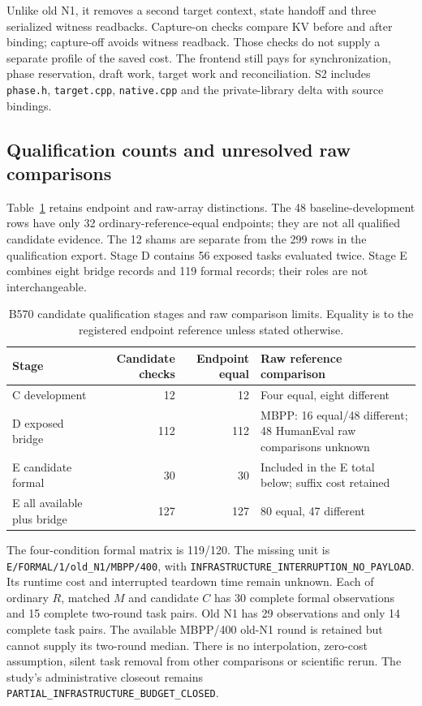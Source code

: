 Unlike old N1, it removes a second target context, state handoff and three serialized witness readbacks. Capture-on checks compare KV before and after binding; capture-off avoids witness readback. Those checks do not supply a separate profile of the saved cost. The frontend still pays for synchronization, phase reservation, draft work, target work and reconciliation. S2 includes \texttt{phase.h}, \texttt{target.cpp}, \texttt{native.cpp} and the private-library delta with source bindings.

\subsection{Qualification counts and unresolved raw comparisons}
Table~\ref{tab:b570_qualification} retains endpoint and raw-array distinctions. The 48 baseline-development rows have only 32 ordinary-reference-equal endpoints; they are not all qualified candidate evidence. The 12 shams are separate from the 299 rows in the qualification export. Stage D contains 56 exposed tasks evaluated twice. Stage E combines eight bridge records and 119 formal records; their roles are not interchangeable.

\begin{table}[ht]\centering\small
\caption{B570 candidate qualification stages and raw comparison limits. Equality is to the registered endpoint reference unless stated otherwise.}
\label{tab:b570_qualification}
\begin{tabularx}{\linewidth}{@{}lrrX@{}}\toprule
Stage & Candidate checks & Endpoint equal & Raw reference comparison\\\midrule
C development & 12 & 12 & Four equal, eight different\\
D exposed bridge & 112 & 112 & MBPP: 16 equal/48 different; 48 HumanEval raw comparisons unknown\\
E candidate formal & 30 & 30 & Included in the E total below; suffix cost retained\\
E all available plus bridge & 127 & 127 & 80 equal, 47 different\\\bottomrule
\end{tabularx}
\end{table}

The four-condition formal matrix is 119/120. The missing unit is \nolinkurl{E/FORMAL/1/old_N1/MBPP/400}, with \nolinkurl{INFRASTRUCTURE_INTERRUPTION_NO_PAYLOAD}. Its runtime cost and interrupted teardown time remain unknown. Each of ordinary $R$, matched $M$ and candidate $C$ has 30 complete formal observations and 15 complete two-round task pairs. Old N1 has 29 observations and only 14 complete task pairs. The available MBPP/400 old-N1 round is retained but cannot supply its two-round median. There is no interpolation, zero-cost assumption, silent task removal from other comparisons or scientific rerun. The study's administrative closeout remains \nolinkurl{PARTIAL_INFRASTRUCTURE_BUDGET_CLOSED}.

